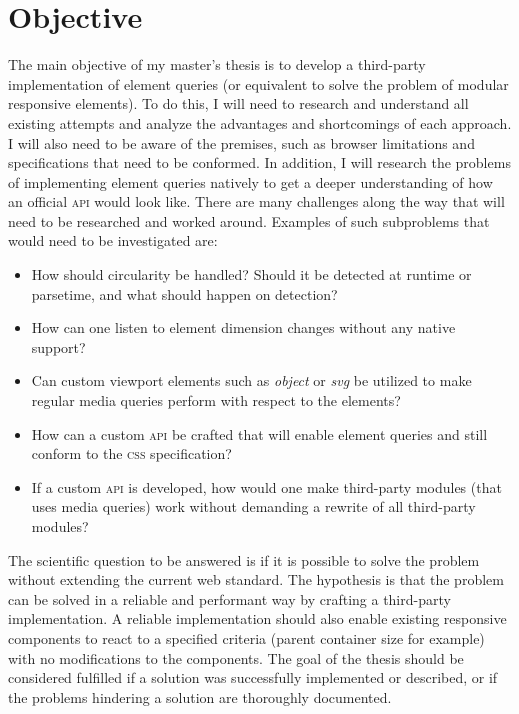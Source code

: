 \documentclass[oneside,a4paper,11pt]{kth-mag}
\begin{document}
\section*{Objective}
The main objective of my master's thesis is to develop a third-party implementation of element queries (or equivalent to solve the problem of modular responsive elements). To do this, I will need to research and understand all existing attempts and analyze the advantages and shortcomings of each approach. I will also need to be aware of the premises, such as browser limitations and specifications that need to be conformed. In addition, I will research the problems of implementing element queries natively to get a deeper understanding of how an official \textsc{api} would look like. There are many challenges along the way that will need to be researched and worked around. Examples of such subproblems that would need to be investigated are:
\begin{itemize}
\item How should circularity be handled? Should it be detected at runtime or parsetime, and what should happen on detection?
\item How can one listen to element dimension changes without any native support?
\item Can custom viewport elements such as \emph{object} or \emph{svg} be utilized to make regular media queries perform with respect to the elements?
\item How can a custom \textsc{api} be crafted that will enable element queries and still conform to the \textsc{css} specification?
\item If a custom \textsc{api} is developed, how would one make third-party modules (that uses media queries) work without demanding a rewrite of all third-party modules?
\end{itemize}
The scientific question to be answered is if it is possible to solve the problem  without extending the current web standard. The hypothesis is that the problem can be solved in a reliable and performant way by crafting a third-party implementation. A reliable implementation should also enable existing responsive components to react to a specified criteria (parent container size for example) with no modifications to the components. The goal of the thesis should be considered fulfilled if a solution was successfully implemented or described, or if the problems hindering a solution are thoroughly documented.
\end{document}
